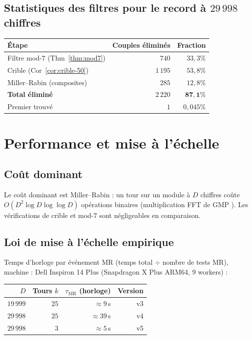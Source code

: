 \documentclass[11pt,a4paper]{article}
\theoremstyle{definition}
\theoremstyle{remark}
\begin{document}
\subsection{Statistiques des filtres pour le record à $29\,998$ chiffres}

\begin{center}
\begin{tabular}{@{}lrr@{}}
\toprule
Étape & Couples éliminés & Fraction \\
\midrule
Filtre mod-$7$ (Thm~\ref{thm:mod7}) & $740$ & $33{,}3\%$ \\
Crible (Cor~\ref{cor:crible-50}) & $1\,195$ & $53{,}8\%$ \\
Miller--Rabin (composites) & $285$ & $12{,}8\%$ \\
\midrule
\textbf{Total éliminé} & $2\,220$ & $\mathbf{87{,}1\%}$ \\
Premier trouvé & $1$ & $0{,}045\%$ \\
\bottomrule
\end{tabular}
\end{center}

\section{Performance et mise à l'échelle}\label{sec:echelle}

\subsection{Coût dominant}

Le coût dominant est Miller--Rabin : un tour sur un module à $D$ chiffres
coûte $O(D^2\log D\log\log D)$ opérations binaires (multiplication FFT
de GMP \cite{GMP}). Les vérifications de crible et mod-$7$ sont
négligeables en comparaison.

\subsection{Loi de mise à l'échelle empirique}

Temps d'horloge par événement MR (temps total $\div$ nombre de tests MR),
machine : Dell Inspiron 14 Plus (Snapdragon X Plus ARM64, 9 workers) :

\begin{center}
\begin{tabular}{@{}rrrr@{}}
\toprule
$D$ & Tours $k$ & $\tau_{\text{MR}}$ (horloge) & Version \\
\midrule
$19\,999$ & $25$ & $\approx 9$\,s  & v3 \\
$29\,998$ & $25$ & $\approx 39$\,s & v4 \\
$29\,998$ & $3$  & $\approx 5$\,s  & v5 \\
\bottomrule
\end{tabular}
\end{center}
\end{document}
